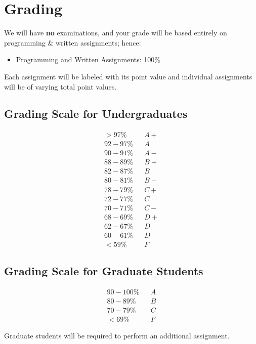 \documentclass[11pt]{article}
\begin{document}
\section{Grading}

We will have {\bf no} examinations, and your grade will be based entirely on programming \& written assignments; hence:
\begin{itemize}
\item Programming and Written Assignments: 100\%
\end{itemize}
Each assignment will be labeled with its point value and individual assignments will be of varying total point values.

\subsection*{Grading Scale for Undergraduates}
\[
\begin{array}{lcl}
> 97\%	&&A+ \\
92-97\%	&&A \\
90-91\%	&&A- \\
88-89\%	&&B+ \\
82-87\%	&&B \\
80-81\%	&&B- \\
78-79\%	&&C+ \\
72-77\%	&&C \\
70-71\%	&&C- \\
68-69\%	&&D+ \\
62-67\%	&&D \\
60-61\%	&&D- \\
< 59\%	&&F
\end{array}
\]

\subsection*{Grading Scale for Graduate Students} 

\[
\begin{array}{lcl}
90-100\%	&&A\\
80-89\%	&&B\\
70-79\%	&&C\\
< 69\%	&&F
\end{array}
\]

Graduate students will be required to perform an additional assignment.

\end{document}
